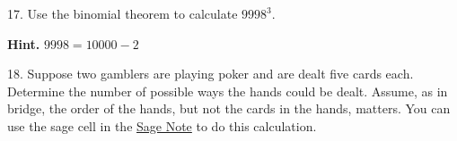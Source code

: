 \documentclass[10pt,]{book}
\theoremstyle{plain}
\theoremstyle{definition}
\begin{document}
\begin{exercisegroup}
\par\smallskip
\item[17.]\hypertarget{exercise-100}{}Use the binomial theorem to calculate \(9998^3\).\par\smallskip
\par\smallskip
\noindent\textbf{Hint.}\hypertarget{hint-1}{}\quad
\(9998 = 10000-2\)\item[18.]\hypertarget{exercise-101}{} Suppose two gamblers are playing poker and are dealt five cards each. 
Determine the number of possible ways the hands could be dealt. Assume, as in bridge, the order of the hands, but not the cards in the hands, matters. You can use the sage cell in the \hyperref[sage-bridge-hands]{Sage Note} to do this calculation. \par\smallskip
\end{exercisegroup}
\par\smallskip\noindent
\end{document}
